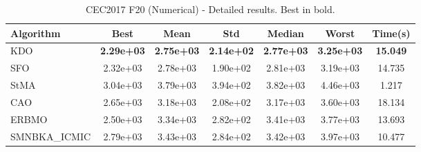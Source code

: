 \begin{table}[H]
\centering\small
\caption{CEC2017 F20 (Numerical) - Detailed results. Best in bold.}
\label{tab:cec2017_F20}
\begin{tabular}{lcccccc}
\toprule
\textbf{Algorithm} & \textbf{Best} & \textbf{Mean} & \textbf{Std} & \textbf{Median} & \textbf{Worst} & \textbf{Time(s)} \\
\midrule
KDO & \textbf{2.29e+03} & \textbf{2.75e+03} & \textbf{2.14e+02} & \textbf{2.77e+03} & \textbf{3.25e+03} & \textbf{15.049} \\
SFO & 2.32e+03 & 2.78e+03 & 1.90e+02 & 2.81e+03 & 3.19e+03 & 14.735 \\
StMA & 3.04e+03 & 3.79e+03 & 3.94e+02 & 3.82e+03 & 4.46e+03 & 1.217 \\
CAO & 2.65e+03 & 3.18e+03 & 2.08e+02 & 3.17e+03 & 3.60e+03 & 18.134 \\
ERBMO & 2.50e+03 & 3.34e+03 & 2.82e+02 & 3.41e+03 & 3.77e+03 & 13.693 \\
SMNBKA_ICMIC & 2.79e+03 & 3.43e+03 & 2.84e+02 & 3.42e+03 & 3.97e+03 & 10.477 \\
\bottomrule
\end{tabular}
\end{table}

